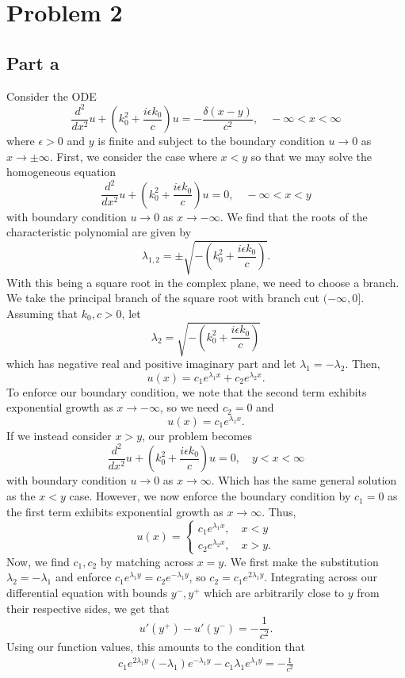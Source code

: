 \documentclass{article}
\begin{document}
\section{Problem 2}
\subsection{Part a}
Consider the ODE 
\[
\frac{d^2 }{dx^2}u+\left(k_0^2+\frac{i\epsilon k_0}{c}\right)u=-\frac{\delta(x-y)}{c^2}, \quad -\infty<x<\infty
\]
where $\epsilon>0$ and $y$ is finite and subject to the boundary condition $u\to0$ as $x\to\pm\infty$. First, we consider the case where $x<y$ so that we may solve the homogeneous equation 
\[
\frac{d^2 }{dx^2}u+\left(k_0^2+\frac{i\epsilon k_0}{c}\right)u=0, \quad -\infty<x<y
\]
with boundary condition $u\to0$ as $x\to-\infty$. We find that the roots of the characteristic polynomial are given by
\[
\lambda_{1,2}=\pm\sqrt{-\left(k_0^2+\frac{i\epsilon k_0}{c}\right)}.
\]
With this being a square root in the complex plane, we need to choose a branch. We take the principal branch of the square root with branch cut $(-\infty,0]$. Assuming that $k_0,c>0$, let 
\[
\lambda_2=\sqrt{-\left(k_0^2+\frac{i\epsilon k_0}{c}\right)}
\]
which has negative real and positive imaginary part and let $\lambda_1=-\lambda_2$. Then, 
\[
u(x)=c_1e^{\lambda_1x}+c_2e^{\lambda_2x}.
\]
To enforce our boundary condition, we note that the second term exhibits exponential growth as $x\to-\infty$, so we need $c_2=0$ and
\[
u(x)=c_1e^{\lambda_1x}.
\]
If we instead consider $x>y$, our problem becomes \[
\frac{d^2 }{dx^2}u+\left(k_0^2+\frac{i\epsilon k_0}{c}\right)u=0, \quad y<x<\infty
\]
with boundary condition $u\to0$ as $x\to\infty$. Which has the same general solution as the $x<y$ case. However, we now enforce the boundary condition by $c_1=0$ as the first term exhibits exponential growth as $x\to\infty$. Thus,
\[
u(x)=\begin{cases}
	c_1e^{\lambda_1x}, \quad x<y\\
	c_2e^{\lambda_2x}, \quad x>y.
\end{cases}
\]
Now, we find $c_1,c_2$ by matching across $x=y$. We first make the substitution $\lambda_2=-\lambda_1$ and enforce $c_1e^{\lambda_1y}=c_2e^{-\lambda_1y}$, so
$c_2=c_1e^{2\lambda_1y}$. Integrating across our differential equation with bounds $y^-,y^+$ which are arbitrarily close to $y$ from their respective sides, we get that 
\[
u'(y^+)-u'(y^-)=-\frac{1}{c^2}.
\]
Using our function values, this amounts to the condition that
\begin{align*}
c_1e^{2\lambda_1y}(-\lambda_1)e^{-\lambda_1y}-c_1\lambda_1e^{\lambda_1y}=-\frac{1}{c^2}
\end{align*}
\end{document}
